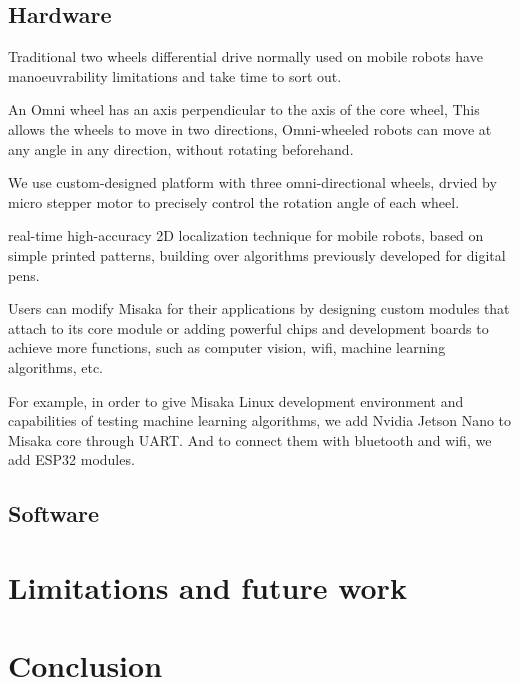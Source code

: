 \documentclass[conference]{IEEEtran}
\begin{document}
\subsection{Hardware}


Traditional two wheels differential drive normally used on mobile robots have manoeuvrability limitations and take time to sort out\cite{ribeiro2004three}. 

An Omni wheel has an axis perpendicular to the axis of the core wheel, This allows the wheels to move in two directions, Omni-wheeled robots can move at any angle in any direction, without rotating beforehand.

We use custom-designed platform with three omni-directional wheels, drvied by micro stepper motor to precisely control the rotation angle of each wheel.

real-time high-accuracy 2D localization technique for mobile robots, based on simple printed patterns, building over algorithms previously developed for digital pens\cite{hostettler2016real}.


Users can modify Misaka for their applications by designing custom modules that attach to its core module or adding powerful chips and development boards to achieve more functions, such as computer vision, wifi, machine learning algorithms, etc.

For example, in order to give Misaka Linux development environment and capabilities of testing machine learning algorithms, we add Nvidia Jetson Nano to Misaka core through UART. And to connect them with bluetooth and wifi, we add ESP32 modules. 

\subsection{Software}

\section{Limitations and future work}

\section{Conclusion}






\end{document}
